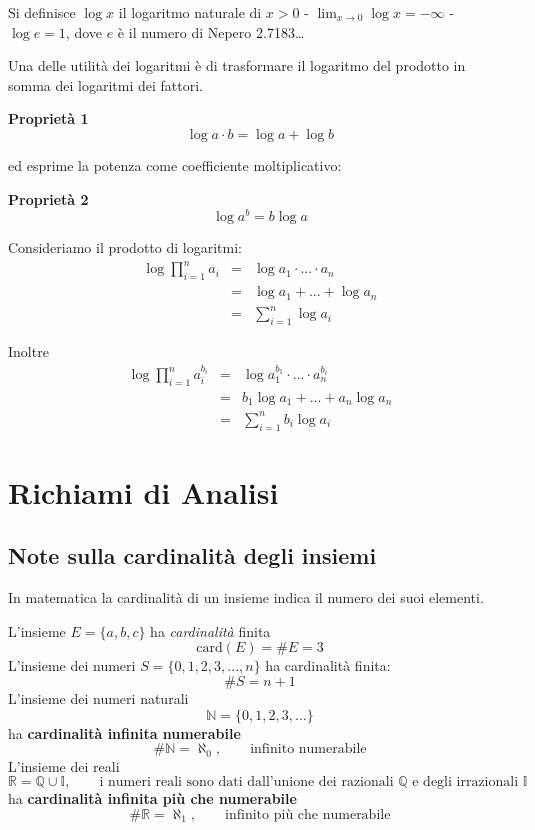 \documentclass[
  11pt,
]{book}
\theoremstyle{mytheoremstyle}
\theoremstyle{mydefstyle}
\begin{document}
Si definisce \(\log x\) il logaritmo naturale di \(x>0\)
- \(\lim_{x\to 0}\log x = -\infty\)
- \(\log e = 1\), dove \(e\) è il numero di Nepero 2.7183\ldots{}

Una delle utilità dei logaritmi è di trasformare il logaritmo del prodotto
in somma dei logaritmi dei fattori.

\textbf{Proprietà 1}
\[\log a\cdot b=\log a + \log b\]

ed esprime la potenza come coefficiente moltiplicativo:

\textbf{Proprietà 2}
\[\log a^b=b\log a\]

Consideriamo il prodotto di logaritmi:
\begin{eqnarray*}
 \log \prod_{i=1}^n a_i &=& \log a_1\cdot...\cdot a_n\\
                       &=& \log a_1+...+\log a_n\\
                       &=& \sum_{i=1}^n \log a_i
\end{eqnarray*}

Inoltre
\begin{eqnarray*}
 \log\prod_{i=1}^n a_i^{b_i} &=& \log a_1^{b_1}\cdot...\cdot a_n^{b_i}\\
                       &=& b_1\log a_1 + ... + a_n\log a_n\\
                       &=& \sum_{i=1}^n b_i\log a_i
\end{eqnarray*}

\section{Richiami di Analisi}\label{richiami-di-analisi}

\subsection{Note sulla cardinalità degli insiemi}\label{note-sulla-cardinalituxe0-degli-insiemi}

In matematica la cardinalità di un insieme indica il numero dei suoi elementi.

L'insieme \(E=\{a,b,c\}\) ha \emph{cardinalità} finita \[\text{card} (E)=\# E = 3\] L'insieme dei numeri \(S=\{0,1,2,3,...,n\}\) ha cardinalità finita: \[\# S = n+1\] L'insieme dei numeri naturali \[
\mathbb{N}=\{0,1,2,3,...\}
\] ha \textbf{cardinalità infinita numerabile} \[\# \mathbb{N} = \aleph_0,\qquad \text{infinito numerabile}\] L'insieme dei reali \[\mathbb{R}=\mathbb{Q}\cup\mathbb{I}, \qquad\text{i numeri reali sono dati dall'unione dei razionali $\mathbb{Q}$ e degli irrazionali $\mathbb{I}$}\] ha \textbf{cardinalità infinita più che numerabile} \[\# \mathbb{R} = \aleph_1,\qquad \text{infinito più che numerabile}\]
\end{document}
